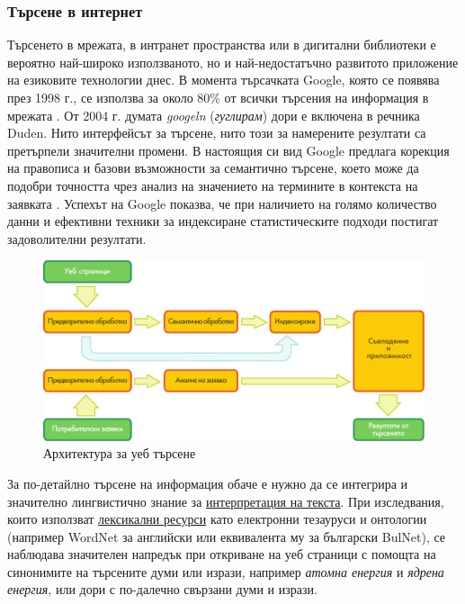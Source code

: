 \documentclass[]{../../metanetpaper}
\begin{document}
\begin{multicols}{2}
\subsubsection{Търсене в интернет}

Търсенето в мрежата, в интранет пространства или в дигитални библиотеки е вероятно най-широко използваното, но и най-недостатъчно развитото приложение на езиковите технологии днес. 
В момента търсачката Google, която се
 появява през 1998 г., се използва за около 80\% от всички търсения на информация в мрежата \cite{spi1}. От 2004 г. думата {\it googeln} ({\it гуглирам}) дори е включена в речника Duden. Нито интерфейсът за търсене, нито този за
 намерените резултати са претърпели значителни
 промени. В настоящия си
 вид Google предлага корекция на правописа и
базови възможности за семантично търсене, което може да подобри
 точността чрез анализ на значението на
 термините в контекста на заявката  \cite{pc1}. Успехът на Google
 показва, че при наличието на голямо количество данни и ефективни
 техники за индексиране статистическите
 подходи постигат задоволителни резултати.

\begin{figure}[htb]
  \center
  \includegraphics[width=\textwidth]{../_media/bulgarian/web_search_architecture}
  \vspace{-5mm}
  \caption{Архитектура за уеб търсене}
  \label{fig:websearcharch_de}
\end{figure}

За по-детайлно търсене на информация обаче е нужно да
 се интегрира и значително лингвистично знание за \uline{интерпретация на текста}. 
При изследвания, които използват \uline{лексикални ресурси} като електронни тезауруси и онтологии (например WordNet за английски или еквивалента му за български BulNet), се наблюдава значителен напредък при откриване на уеб
 страници с помощта на синонимите на търсените думи или изрази, например {\it атомна енергия} и {\it ядрена енергия}, или дори с по-далечно свързани думи и изрази.


\end{multicols}
\end{document}
